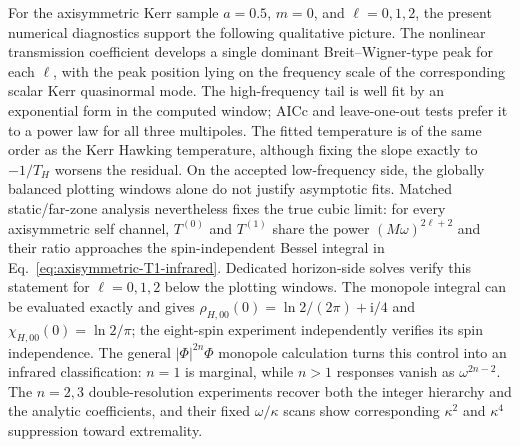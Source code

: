 \documentclass[aps,prd,twocolumn,10pt,nofootinbib,superscriptaddress,floatfix]{revtex4-2}
\newcommand{\ii}{\mathrm{i}}
\begin{document}
For the axisymmetric Kerr sample $a=0.5$, $m=0$, and $\ell=0,1,2$, the present
numerical diagnostics support the following qualitative picture.  The nonlinear
transmission coefficient develops a single dominant Breit--Wigner-type peak for
each $\ell$, with the peak position lying on the frequency scale of the corresponding
scalar Kerr quasinormal mode.  The high-frequency tail is well fit by an
exponential form in the computed window; AICc and leave-one-out tests prefer it
to a power law for all three multipoles.  The fitted temperature is of the
same order as the Kerr Hawking temperature, although fixing the slope exactly
to $-1/T_H$ worsens the residual.  On the accepted low-frequency side, the
globally balanced plotting windows alone do not justify asymptotic fits.
Matched static/far-zone analysis nevertheless fixes the true cubic limit:
for every axisymmetric self channel, $T^{(0)}$ and $T^{(1)}$ share the power
$(M\omega)^{2\ell+2}$ and their ratio approaches the spin-independent Bessel
integral in Eq.~\eqref{eq:axisymmetric-T1-infrared}.  Dedicated horizon-side
solves verify this statement for $\ell=0,1,2$ below the plotting windows.  The
monopole integral can be evaluated exactly and gives
$\rho_{H,00}(0)=\ln2/(2\pi)+\ii/4$ and
$\chi_{H,00}(0)=\ln2/\pi$; the eight-spin experiment independently verifies
its spin independence.  The general $|\Phi|^{2n}\Phi$ monopole calculation
turns this control into an
infrared classification: $n=1$ is marginal, while $n>1$ responses vanish as
$\omega^{2n-2}$.  The $n=2,3$ double-resolution experiments recover both the
integer hierarchy and the analytic coefficients, and their fixed
$\omega/\kappa$ scans show corresponding $\kappa^2$ and $\kappa^4$
suppression toward extremality.
\end{document}
